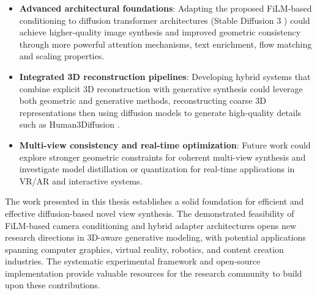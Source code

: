 \begin{itemize}
  \item \textbf{Advanced architectural foundations}: Adapting the proposed FiLM-based conditioning to diffusion transformer architectures (Stable Diffusion 3 \cite{stable_diffusion_3, diffusion_transformers}) could achieve higher-quality image synthesis and improved geometric consistency through more powerful attention mechanisms, text enrichment, flow matching and scaling properties.

  \item \textbf{Integrated 3D reconstruction pipelines}: Developing hybrid systems that combine explicit 3D reconstruction with generative synthesis could leverage both geometric and generative methods, reconstructing coarse 3D representations then using diffusion models to generate high-quality details such as Human3Diffusion \cite{human3diffusion}.

  \item \textbf{Multi-view consistency and real-time optimization}: Future work could explore stronger geometric constraints for coherent multi-view synthesis and investigate model distillation or quantization for real-time applications in VR/AR and interactive systems.
\end{itemize}

The work presented in this thesis establishes a solid foundation for efficient and effective diffusion-based novel view synthesis. The demonstrated feasibility of FiLM-based camera conditioning and hybrid adapter architectures opens new research directions in 3D-aware generative modeling, with potential applications spanning computer graphics, virtual reality, robotics, and content creation industries. The systematic experimental framework and open-source implementation provide valuable resources for the research community to build upon these contributions.
